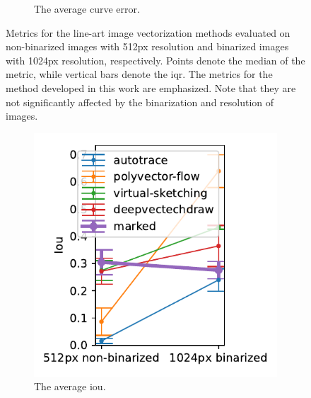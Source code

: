 \begin{figure}[h]
\begin{subfigure}{.3\textwidth}
    \caption{The average curve error.}
\end{subfigure}
    \caption{Metrics for the line-art image vectorization methods evaluated on non-binarized images with 512px resolution and binarized images with 1024px resolution, respectively. Points denote the median of the metric, while vertical bars denote the \gls{iqr}. The metrics for the method developed in this work are emphasized. Note that they are not significantly affected by the binarization and resolution of images.}
    \label{fig:res_binarization_comparison}
\end{figure}

\begin{figure}[h]
    \centering
    \begin{subfigure}{.3\textwidth}
    \centering
    \includegraphics[width=\textwidth]{graphics/eval/iou_res_binarization_sketchbench.pdf}
    \caption{The average \gls{iou}.}
\end{subfigure}
    \begin{subfigure}{.3\textwidth}
    \centering

\end{subfigure}
\end{figure}
